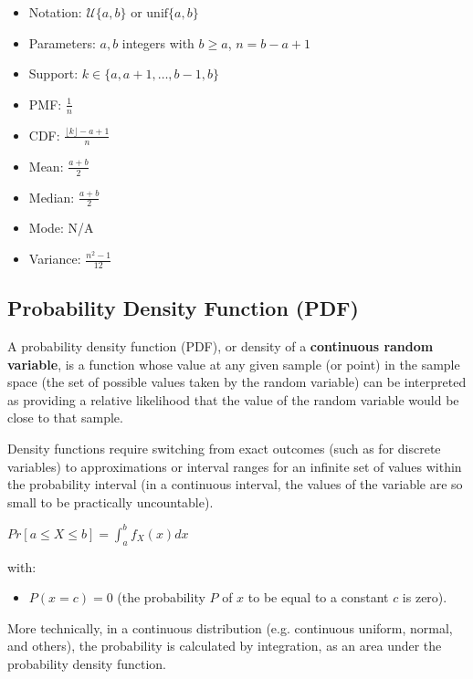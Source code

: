 \documentclass{article}
\begin{document}
\begin{itemize}
    \item Notation: $\displaystyle {\mathcal{U}}\{a,b\}$ or $\displaystyle \text{unif} \{a,b\}$
    \item Parameters: $\displaystyle a,b$ integers with $\displaystyle b\geq a$, $\displaystyle n=b-a+1$
    \item Support: $\displaystyle k\in \{a,a+1,\dots ,b-1,b\}$
    \item PMF: $\displaystyle {\frac {1}{n}}$
    \item CDF: $\displaystyle {\frac {\lfloor k\rfloor -a+1}{n}}$ 
    \item Mean: $\displaystyle {\frac {a+b}{2}}$ 
    \item Median: $\displaystyle {\frac {a+b}{2}}$
    \item Mode:	N/A
    \item Variance: $\displaystyle {\frac {n^{2}-1}{12}}$
\end{itemize}

\subsection{Probability Density Function (PDF)}

A probability density function (PDF), or density of a \textbf{continuous random variable}, is a function whose value at any given sample (or point) in the sample space (the set of possible values taken by the random variable) can be interpreted as providing a relative likelihood that the value of the random variable would be close to that sample.

Density functions require switching from exact outcomes (such as for discrete variables) to approximations or interval ranges for an infinite set of values within the probability interval (in a continuous interval, the values of the variable are so small to be practically uncountable).

$\displaystyle Pr[a\leq X\leq b]=\int _{a}^{b}f_{X}(x)dx$

with:
\begin{itemize}
    \item $P(x=c)=0$ (the probability $P$ of $x$ to be equal to a constant $c$ is zero).
\end{itemize}

More technically, in a continuous distribution (e.g. continuous uniform, normal, and others), the probability is calculated by integration, as an area under the probability density function.
\end{document}
